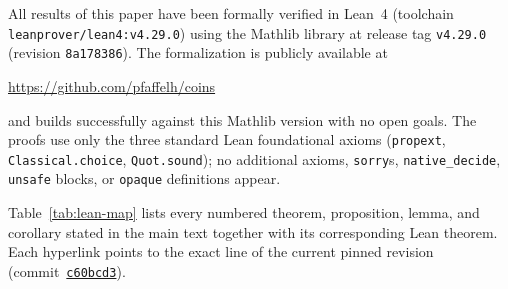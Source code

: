 \documentclass[12pt]{article}
\theoremstyle{definition}
\theoremstyle{remark}
\begin{document}
All results of this paper have been formally verified in
Lean~4 (toolchain \texttt{leanprover/lean4:v4.29.0}) using the
Mathlib library at release tag \texttt{v4.29.0} (revision
\texttt{8a178386}).  The formalization is publicly available at
\begin{center}
  \url{https://github.com/pfaffelh/coins}
\end{center}
and builds successfully against this Mathlib version with no open
goals.  The proofs use only the three standard Lean foundational
axioms (\texttt{propext}, \texttt{Classical.choice},
\texttt{Quot.sound}); no additional axioms, \texttt{sorry}s,
\texttt{native\_decide}, \texttt{unsafe} blocks, or
\texttt{opaque} definitions appear.

Table~\ref{tab:lean-map} lists every numbered theorem,
proposition, lemma, and corollary stated in the main text together
with its corresponding Lean theorem.  Each hyperlink points to the
exact line of the current pinned revision
(commit~\href{https://github.com/pfaffelh/coins/tree/c60bcd3}{\texttt{c60bcd3}}).
\end{document}

